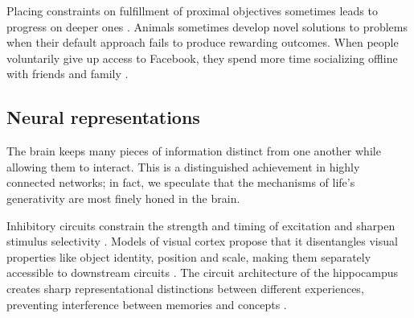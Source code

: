 \documentclass[11pt]{article}
\begin{document}
Placing constraints on fulfillment of proximal objectives sometimes leads to progress on deeper ones \citep{duncker1945on, rosenberg1969direction, stokes2005creativity, ohlsson1992information}. Animals sometimes develop novel solutions to problems when their default approach fails to produce rewarding outcomes. When people voluntarily give up access to Facebook, they spend more time socializing offline with friends and family \citep{allcott2020welfare}. 









\subsection*{Neural representations}

The brain keeps many pieces of information distinct from one another while allowing them to interact. This is a distinguished achievement in highly connected networks; in fact, we speculate that the mechanisms of life's generativity are most finely honed in the brain.

Inhibitory circuits constrain the strength and timing of excitation and sharpen stimulus selectivity \citep{isaacson2011inhibition}. Models of visual cortex propose that it disentangles visual properties like object identity, position and scale, making them separately accessible to downstream circuits \citep{dicarlo2012how}. The circuit architecture of the hippocampus creates sharp representational distinctions between different experiences, preventing interference between memories and concepts \citep{leutgeb2007pattern,yassa2011pattern}.
\end{document}
